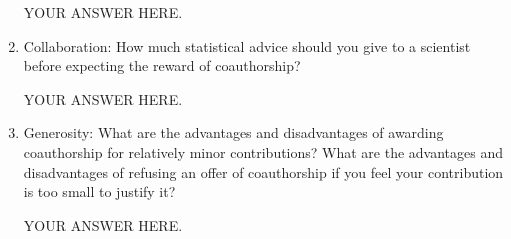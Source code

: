 \documentclass[12pt]{article}
\begin{document}
\begin{enumerate}
YOUR ANSWER HERE.

\item Collaboration: How much statistical advice should you give to a scientist before expecting the reward of coauthorship?

YOUR ANSWER HERE.

\item Generosity: What are the advantages and disadvantages of awarding coauthorship for relatively minor contributions? What are the advantages and disadvantages of refusing an offer of coauthorship if you feel your contribution is too small to justify it?

YOUR ANSWER HERE.

\end{enumerate}
\end{document}
